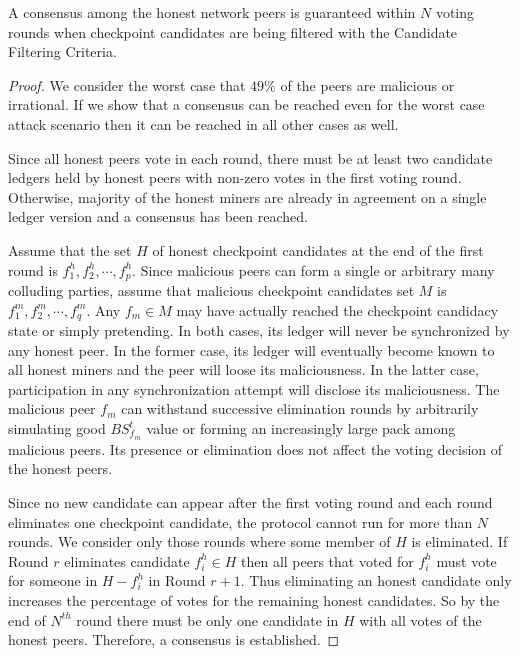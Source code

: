 \begin{lemma}
\label{l-consensus}
A consensus among the honest network peers is guaranteed within $N$ voting rounds when checkpoint candidates are being filtered with the Candidate Filtering Criteria. 
\end{lemma}  
\begin{proof}
We consider the worst case that $49\%$ of the peers are malicious or irrational. If we show that a consensus can be reached even for the worst case attack scenario then it can be reached in all other cases as well.

Since all honest peers vote in each round, there must be at least two candidate ledgers held by honest peers with non-zero votes in the first voting round. Otherwise, majority of the honest miners are already in agreement on a single ledger version and a consensus has been reached. 

Assume that the set $H$ of honest checkpoint candidates at the end of the first round is ${f_1^h, f_2^h, \cdots, f_p^h}$. Since malicious peers can form a single or arbitrary many colluding parties, assume that malicious checkpoint candidates set $M$ is ${f_1^m, f_2^m, \cdots, f_q^m}$. Any $f_m \in M$ may have actually reached the checkpoint candidacy state or simply pretending. In both cases, its ledger will never be synchronized by any honest peer. In the former case, its ledger will eventually become known to all honest miners and the peer will loose its maliciousness. In the latter case, participation in any synchronization attempt will disclose its maliciousness. The malicious peer $f_m$ can withstand successive elimination rounds by arbitrarily simulating good $BS_{f_m}^t$ value or forming an increasingly large pack among malicious peers. Its presence or elimination does not affect the voting decision of the honest peers. 

Since no new candidate can appear after the first voting round and each round eliminates one checkpoint candidate, the protocol cannot run for more than $N$ rounds. We consider only those rounds where some member of $H$ is eliminated. If Round $r$ eliminates candidate $f_i^h \in H$ then all peers that voted for $f_i^h$ must vote for someone in $H - {f_i^h}$ in Round $r + 1$. Thus eliminating an honest candidate only increases the percentage of votes for the remaining honest candidates. So by the end of $N^{th}$ round there must be only one candidate in $H$ with all votes of the honest peers. Therefore, a consensus is established.                
\end{proof}

